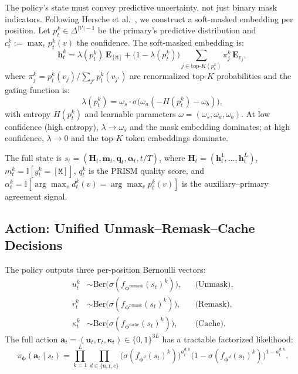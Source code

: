 \documentclass[11pt]{article}
\newcommand{\cV}{\mathcal{V}}
\newcommand{\bphi}{\bm{\phi}}
\newcommand{\bu}{\mathbf{u}}
\newcommand{\bh}{\mathbf{h}}
\newcommand{\bH}{\mathbf{H}}
\newcommand{\bfm}{\mathbf{m}}
\newcommand{\ind}{\mathbb{I}}
\newcommand{\mask}{\ensuremath{\mathtt{[M]}}}
\begin{document}
The policy's state must convey predictive uncertainty, not just binary mask indicators.
Following Hersche et al.~\cite{hersche2025softmasked}, we construct a soft-masked embedding per position.
Let $p_t^k \in \Delta^{|\cV|-1}$ be the primary's predictive distribution and $c_t^k := \max_v p_t^k(v)$ the confidence.
The soft-masked embedding is:
\begin{equation}
    \bh_t^k = \lambda(p_t^k)\, \mathbf{E}_{\mask} + \bigl(1 - \lambda(p_t^k)\bigr) \sum_{j \in \text{top-}K(p_t^k)} \pi_j^k\, \mathbf{E}_{v_j},
    \label{eq:softmask}
\end{equation}
where $\pi_j^k = p_t^k(v_j) / \sum_{j'} p_t^k(v_{j'})$ are renormalized top-$K$ probabilities and the gating function is:
\begin{equation}
    \lambda(p_t^k) = \omega_s \cdot \sigma\!\bigl(\omega_a(-H(p_t^k) - \omega_b)\bigr),
    \label{eq:gating}
\end{equation}
with entropy $H(p_t^k)$ and learnable parameters $\omega = (\omega_s, \omega_a, \omega_b)$.
At low confidence (high entropy), $\lambda \to \omega_s$ and the mask embedding dominates; at high confidence, $\lambda \to 0$ and the top-$K$ token embeddings dominate.

The full state is $s_t = (\bH_t, \bfm_t, \mathbf{q}_t, \bm{\alpha}_t, t/T)$, where $\bH_t = (\bh_t^1, \dots, \bh_t^L)$, $m_t^k = \ind[y_t^k = \mask]$, $q_t^k$ is the PRISM quality score, and $\alpha_t^k = \ind[\arg\max_v d_t^k(v) = \arg\max_v p_t^k(v)]$ is the auxiliary--primary agreement signal.

\subsection{Action: Unified Unmask--Remask--Cache Decisions}
\label{sec:action}

The policy outputs three per-position Bernoulli vectors:
\begin{align}
    u_t^k &\sim \text{Ber}\bigl(\sigma(f_{\bphi^{\text{unmask}}}(s_t)^k)\bigr), & &\text{(Unmask)}, \label{eq:action_u} \\
    r_t^k &\sim \text{Ber}\bigl(\sigma(f_{\bphi^{\text{remask}}}(s_t)^k)\bigr), & &\text{(Remask)}, \label{eq:action_r} \\
    \kappa_t^k &\sim \text{Ber}\bigl(\sigma(f_{\bphi^{\text{cache}}}(s_t)^k)\bigr), & &\text{(Cache)}. \label{eq:action_c}
\end{align}
The full action $\mathbf{a}_t = (\bu_t, \mathbf{r}_t, \bm{\kappa}_t) \in \{0,1\}^{3L}$ has a tractable factorized likelihood:
\begin{equation}
    \pi_{\bphi}(\mathbf{a}_t \mid s_t) = \prod_{k=1}^L \prod_{d \in \{\text{u}, \text{r}, \text{c}\}} \bigl(\sigma(f_{\bphi^d}(s_t)^k)\bigr)^{a_t^{d,k}} \bigl(1 - \sigma(f_{\bphi^d}(s_t)^k)\bigr)^{1 - a_t^{d,k}}.
    \label{eq:policy_likelihood}
\end{equation}
\end{document}
